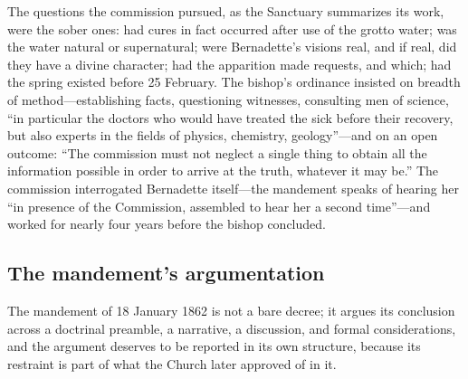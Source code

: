 The questions the commission pursued, as the Sanctuary summarizes
its work, were the sober ones: had cures in fact occurred after
use of the grotto water; was the water natural or supernatural;
were Bernadette's visions real, and if real, did they have a
divine character; had the apparition made requests, and which; had
the spring existed before 25 February. The bishop's ordinance
insisted on breadth of method---establishing facts, questioning
witnesses, consulting men of science, ``in particular the doctors
who would have treated the sick before their recovery, but also
experts in the fields of physics, chemistry, geology''---and on an
open outcome: ``The commission must not neglect a single thing to
obtain all the information possible in order to arrive at the
truth, whatever it may be.'' The commission interrogated Bernadette
itself---the mandement speaks of hearing her ``in presence of the
Commission, assembled to hear her a second time''---and worked for
nearly four years before the bishop concluded.

\subsection{The mandement's argumentation}

The mandement of 18 January 1862 is not a bare decree; it argues
its conclusion across a doctrinal preamble, a narrative, a
discussion, and formal considerations, and the argument deserves
to be reported in its own structure, because its restraint is part
of what the Church later approved of in it.

